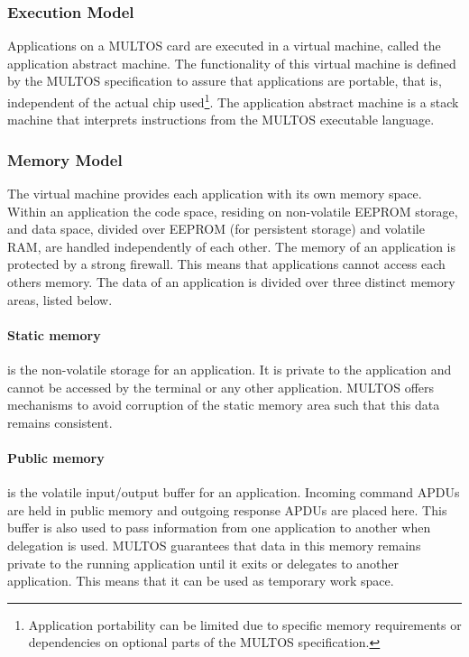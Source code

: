 \subsubsection{Execution Model}

Applications on a MULTOS card are executed in a virtual machine, called the
application abstract machine. The functionality of this virtual machine is
defined by the MULTOS specification to assure that applications are portable,
that is, independent of the actual chip used\footnote{Application portability
can be limited due to specific memory requirements or dependencies on optional
parts of the MULTOS specification.}. The application abstract machine is a stack
machine that interprets instructions from the MULTOS executable language.

\subsubsection{Memory Model}

The virtual machine provides each application with its own memory space. Within
an application the code space, residing on non-volatile EEPROM storage, and data
space, divided over EEPROM (for persistent storage) and volatile RAM, are
handled independently of each other. The memory of an application is protected
by a strong firewall. This means that applications cannot access each others
memory. The data of an application is divided over three distinct memory areas,
listed below.

\paragraph{Static memory} is the non-volatile storage for an application. It is
private to the application and cannot be accessed by the terminal or any other
application. MULTOS offers mechanisms to avoid corruption of the static memory
area such that this data remains consistent.

\paragraph{Public memory} is the volatile input/output buffer for an
application. Incoming command APDUs are held in public memory and outgoing
response APDUs are placed here. This buffer is also used to pass information
from one application to another when delegation is used. MULTOS guarantees that
data in this memory remains private to the running application until it exits
or delegates to another application. This means that it can be used as
temporary work space.

